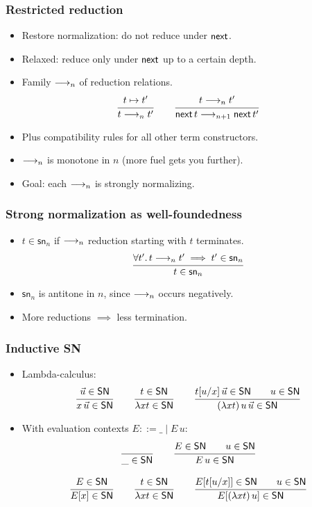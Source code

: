 \documentclass[t]{beamer}
\newcommand{\nex}{\tnext\,}
\renewcommand{\sn}{\mathsf{sn}}
\renewcommand{\SN}{\mathsf{SN}}
\begin{document}
\begin{frame}%
  \frametitle{Restricted reduction}
  \begin{itemize}
  \item Restore normalization: do not reduce under $\mathsf{next}$.
  \item Relaxed: reduce only under $\mathsf{next}$ up to a certain depth.
  \item Family $\longrightarrow_n$ of reduction relations.
\[
  \ru{t \contr t'}{t \red_n t'}
\qquad
  \ru{t \red_n t'}{\nex t \red_{n+1} \nex t'}
\]
  \item Plus compatibility rules for all other term constructors.
  \item $\longrightarrow_n$ is monotone in $n$  (more fuel gets you further).
  \item Goal: each $\longrightarrow_n$ is strongly normalizing.
  \end{itemize}
\end{frame}


\begin{frame}%
  \frametitle{Strong normalization as well-foundedness}
  \begin{itemize}
  \item $t \in \sn_n$ if $\longrightarrow_n$ reduction starting with $t$
    terminates.
\[
  \ru{\forall t'.\, t \red_n t' \implies t' \in \sn_n
    }{t \in \sn_n}
\]
  \item $\sn_n$ is antitone in $n$, since $\longrightarrow_n$ occurs negatively.
  \item More reductions $\implies$ less termination.
  \end{itemize}
\end{frame}


\begin{frame}%
  \frametitle{Inductive SN}
  \begin{itemize}
  \item Lambda-calculus:
\[
  \ru{\vec u \in \SN
    }{x\,\vec u \in \SN}
\qquad
  \ru{t\in\SN}{\lambda x t \in \SN}
\qquad
  \ru{\subst u x t\, \vec u \in \SN \qquad u \in \SN
    }{(\lambda x t)\,u\,\vec u \in \SN}
\]
  \item With evaluation contexts $E ::= \_ \mid E\,u$:
\begin{gather*}
  \ru{}{\_ \in \SN}
\qquad
  \ru{E \in \SN \qquad u \in \SN}{E\,u \in \SN}
\\[2ex]
  \ru{E \in \SN
    }{E[x] \in \SN}
\qquad
  \ru{t\in\SN}{\lambda x t \in \SN}
\qquad
  \ru{E[\subst u x t] \in \SN \qquad u \in \SN
    }{E[(\lambda x t)\,u] \in \SN}
\end{gather*}
  \end{itemize}
\end{frame}
\end{document}
